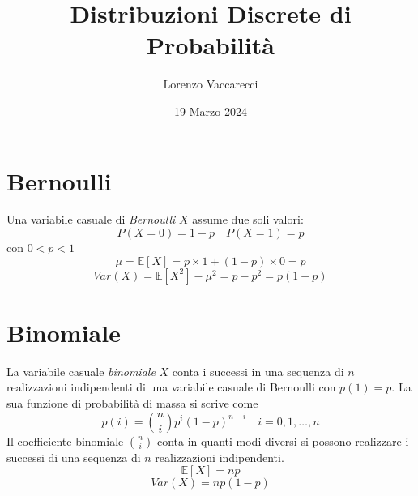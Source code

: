 \documentclass[12pt]{article}
\title{Distribuzioni Discrete di Probabilità}
\author{Lorenzo Vaccarecci}
\date{19 Marzo 2024}
\begin{document}
\maketitle
\section{Bernoulli}
Una variabile casuale di \textit{Bernoulli} $X$ assume due soli valori:
\begin{equation*}
    P(X=0)=1-p \quad P(X=1)=p
\end{equation*}
con $0<p<1$
\begin{equation*}
    \mu = \mathbb{E}\left[X\right]=p\times 1+(1-p)\times 0=p
\end{equation*}
\begin{equation*}
    Var(X)=\mathbb{E}\left[X^{2}\right]-\mu^{2}=p-p^{2}=p(1-p)
\end{equation*}
\section{Binomiale}
La variabile casuale \textit{binomiale} $X$ conta i successi in una sequenza di $n$ realizzazioni indipendenti di una variabile casuale di Bernoulli con $p(1)=p$. La sua funzione di probabilità di massa si scrive come
\begin{equation*}
    p(i)=\binom{n}{i}p^{i}(1-p)^{n-i} \quad i=0,1,\dots,n
\end{equation*}
Il coefficiente binomiale $\binom{n}{i}$ conta in quanti modi diversi si possono realizzare i successi di una sequenza di $n$ realizzazioni indipendenti.
\begin{equation*}
    \mathbb{E}\left[X\right]=np 
\end{equation*}
\begin{equation*}
    Var(X)=np(1-p)
\end{equation*}\newpage
\end{document}
